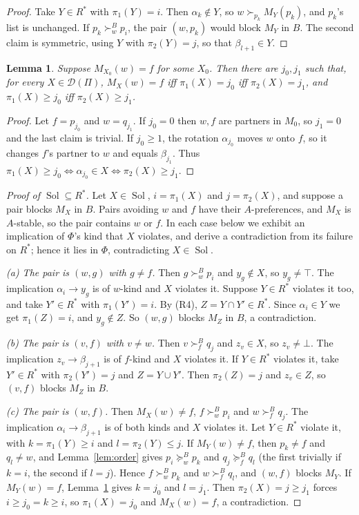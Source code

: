 \documentclass[11pt]{amsart}
\newtheorem{lemma}[theorem]{Lemma}
\theoremstyle{definition}
\theoremstyle{remark}
\newcommand{\D}{\mathcal D}
\newcommand{\Sol}{\operatorname{Sol}}
\begin{document}
\begin{proof}
Take $Y\in R^*$ with $\pi_1(Y)=i$. Then $\alpha_k\notin Y$, so $w\succ_{p_k}M_Y(p_k)$, and $p_k$'s list is unchanged. If $p_k\succ^B_w p_i$, the pair $(w,p_k)$ would block $M_Y$ in $B$. The second claim is symmetric, using $Y$ with $\pi_2(Y)=j$, so that $\beta_{l+1}\in Y$.
\end{proof}

\begin{lemma}\label{lem:couple}
Suppose $M_{X_0}(w)=f$ for some $X_0$. Then there are $j_0,j_1$ such that, for every $X\in\D(\Pi)$, $M_X(w)=f$ iff $\pi_1(X)=j_0$ iff $\pi_2(X)=j_1$, and $\pi_1(X)\ge j_0$ iff $\pi_2(X)\ge j_1$.
\end{lemma}

\begin{proof}
Let $f=p_{j_0}$ and $w=q_{j_1}$. If $j_0=0$ then $w,f$ are partners in $M_0$, so $j_1=0$ and the last claim is trivial. If $j_0\ge1$, the rotation $\alpha_{j_0}$ moves $w$ onto $f$, so it changes $f$'s partner to $w$ and equals $\beta_{j_1}$. Thus $\pi_1(X)\ge j_0\iff\alpha_{j_0}\in X\iff\pi_2(X)\ge j_1$.
\end{proof}

\begin{proof}[Proof of $\Sol\subseteq R^*$]
Let $X\in\Sol$, $i=\pi_1(X)$ and $j=\pi_2(X)$, and suppose a pair blocks $M_X$ in $B$. Pairs avoiding $w$ and $f$ have their $A$-preferences, and $M_X$ is $A$-stable, so the pair contains $w$ or $f$. In each case below we exhibit an implication of $\Phi$'s kind that $X$ violates, and derive a contradiction from its failure on $R^*$; hence it lies in $\Phi$, contradicting $X\in\Sol$.

\emph{(a) The pair is $(w,g)$ with $g\ne f$.} Then $g\succ^B_w p_i$ and $y_g\notin X$, so $y_g\ne\top$. The implication $\alpha_i\to y_g$ is of $w$-kind and $X$ violates it. Suppose $Y\in R^*$ violates it too, and take $Y'\in R^*$ with $\pi_1(Y')=i$. By (R4), $Z=Y\cap Y'\in R^*$. Since $\alpha_i\in Y$ we get $\pi_1(Z)=i$, and $y_g\notin Z$. So $(w,g)$ blocks $M_Z$ in $B$, a contradiction.

\emph{(b) The pair is $(v,f)$ with $v\ne w$.} Then $v\succ^B_f q_j$ and $z_v\in X$, so $z_v\ne\bot$. The implication $z_v\to\beta_{j+1}$ is of $f$-kind and $X$ violates it. If $Y\in R^*$ violates it, take $Y'\in R^*$ with $\pi_2(Y')=j$ and $Z=Y\cup Y'$. Then $\pi_2(Z)=j$ and $z_v\in Z$, so $(v,f)$ blocks $M_Z$ in $B$.

\emph{(c) The pair is $(w,f)$.} Then $M_X(w)\ne f$, $f\succ^B_w p_i$ and $w\succ^B_f q_j$. The implication $\alpha_i\to\beta_{j+1}$ is of both kinds and $X$ violates it. Let $Y\in R^*$ violate it, with $k=\pi_1(Y)\ge i$ and $l=\pi_2(Y)\le j$. If $M_Y(w)\ne f$, then $p_k\ne f$ and $q_l\ne w$, and Lemma~\ref{lem:order} gives $p_i\succeq^B_w p_k$ and $q_j\succeq^B_f q_l$ (the first trivially if $k=i$, the second if $l=j$). Hence $f\succ^B_w p_k$ and $w\succ^B_f q_l$, and $(w,f)$ blocks $M_Y$. If $M_Y(w)=f$, Lemma~\ref{lem:couple} gives $k=j_0$ and $l=j_1$. Then $\pi_2(X)=j\ge j_1$ forces $i\ge j_0=k\ge i$, so $\pi_1(X)=j_0$ and $M_X(w)=f$, a contradiction.
\end{proof}
\end{document}
